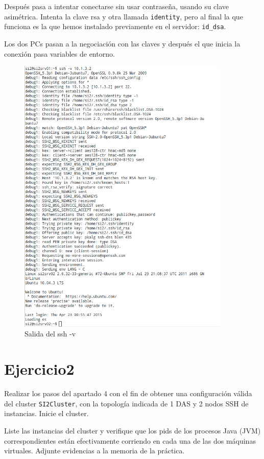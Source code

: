 \documentclass[a4paper, 10pt]{article}
\begin{document}
Después pasa a intentar conectarse sin usar contraseña, usando su clave asimétrica. Intenta la clave rsa y otra llamada \texttt{identity}, pero al final la que funciona es la que hemos instalado previamente en el servidor: \texttt{id\_dsa}.

Los dos PCs pasan a la negociación con las claves y después el que inicia la conexión pasa variables de entorno. 

\begin{figure}[hbtp]
	\centering
	\includegraphics[width=0.9\textwidth]{../../P3/pantallazos/ssh-v.png}
	\caption {Salida del ssh -v}
\end{figure}

 
\section{Ejercicio2}


\begin{mdframed}
	 Realizar los pasos del apartado 4 con el fin de obtener una configuración válida del cluster
	 \texttt{SI2Cluster}, con la topología indicada de 1 DAS y 2 nodos SSH de instancias. Inicie el cluster. 
	 
	 Liste las instancias del cluster y verifique que los pids de los procesos Java (JVM) correspondientes están
	 efectivamente corriendo en cada una de las dos máquinas virtuales. Adjunte evidencias a la memoria de la
	 práctica. 
\end{mdframed}	
\end{document}
